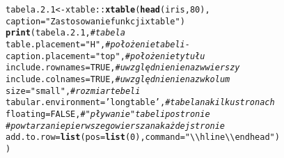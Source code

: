 \documentclass[a4paper, 10pt]{article}\usepackage[]{graphicx}\usepackage[]{color}
\makeatletter
\newcommand{\hlnum}[1]{\textcolor[rgb]{0.686,0.059,0.569}{#1}}%
\newcommand{\hlstr}[1]{\textcolor[rgb]{0.192,0.494,0.8}{#1}}%
\newcommand{\hlcom}[1]{\textcolor[rgb]{0.678,0.584,0.686}{\textit{#1}}}%
\newcommand{\hlstd}[1]{\textcolor[rgb]{0.345,0.345,0.345}{#1}}%
\newcommand{\hlkwb}[1]{\textcolor[rgb]{0.69,0.353,0.396}{#1}}%
\newcommand{\hlkwc}[1]{\textcolor[rgb]{0.333,0.667,0.333}{#1}}%
\newcommand{\hlkwd}[1]{\textcolor[rgb]{0.737,0.353,0.396}{\textbf{#1}}}%
\newenvironment{kframe}{%
 \def\at@end@of@kframe{}%
 \ifinner\ifhmode%
  \def\at@end@of@kframe{\end{minipage}}%
  \begin{minipage}{\columnwidth}%
 \fi\fi%
 \def\FrameCommand##1{\hskip\@totalleftmargin \hskip-\fboxsep
 \colorbox{shadecolor}{##1}\hskip-\fboxsep
     \hskip-\linewidth \hskip-\@totalleftmargin \hskip\columnwidth}%
 \MakeFramed {\advance\hsize-\width
   \@totalleftmargin\z@ \linewidth\hsize
   \@setminipage}}%
 {\par\unskip\endMakeFramed%
 \at@end@of@kframe}
\makeatother
\begin{document}
\begin{kframe}
\begin{alltt}
\hlstd{tabela.2.1}\hlkwb{<-}\hlstd{xtable::} \hlkwd{xtable}\hlstd{(}\hlkwd{head}\hlstd{(iris,} \hlnum{80}\hlstd{),}
                            \hlkwc{caption}\hlstd{=}\hlstr{"Zastosowanie funkcji xtable "}\hlstd{)}
\hlkwd{print}\hlstd{( tabela.2.1,} \hlcom{# tabela}
       \hlkwc{table.placement} \hlstd{=} \hlstr{"H"}\hlstd{,} \hlcom{# położenie tabeli - }
       \hlkwc{caption.placement} \hlstd{=} \hlstr{"top"}\hlstd{,} \hlcom{# położenie tytułu}
       \hlkwc{include.rownames} \hlstd{=} \hlnum{TRUE}\hlstd{,} \hlcom{# uwzględnienie nazw wierszy}
       \hlkwc{include.colnames} \hlstd{=} \hlnum{TRUE}\hlstd{,} \hlcom{# uwzględnienie nazw kolum}
       \hlkwc{size} \hlstd{=} \hlstr{"small"}\hlstd{,} \hlcom{# rozmiar tebeli}
       \hlkwc{tabular.environment} \hlstd{=} \hlstr{'longtable'}\hlstd{,} \hlcom{# tabela na kilku stronach}
       \hlkwc{floating} \hlstd{=} \hlnum{FALSE}\hlstd{,} \hlcom{# "pływanie" tabeli po stronie}
       \hlcom{# powtarzanie pierwszego wiersza na każdej stronie}
       \hlkwc{add.to.row} \hlstd{=} \hlkwd{list}\hlstd{(}\hlkwc{pos} \hlstd{=} \hlkwd{list}\hlstd{(}\hlnum{0}\hlstd{),} \hlkwc{command} \hlstd{=} \hlstr{"\textbackslash{}\textbackslash{}hline \textbackslash{}\textbackslash{}endhead "}\hlstd{)}
\hlstd{)}
\end{alltt}
\end{kframe}%
\end{document}
